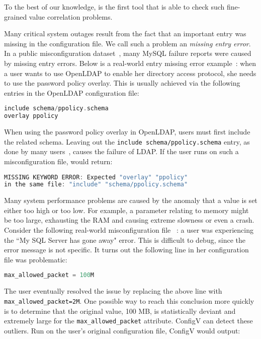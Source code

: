 To the best of our knowledge, \app is the first tool that
is able to check such fine-grained value correlation problems.


Many critical system outages result from the fact that an important
entry was missing in the configuration file. 
We call such a problem an {\em missing entry error}.
In a public misconfiguration dataset~\cite{configdataset},
many MySQL failure reports were caused by
missing entry errors.
Below is a real-world entry missing error example~\cite{yin11anempirical}:
when a user wants to use OpenLDAP to enable her directory access
protocol, she needs to use the password policy overlay. This is usually
achieved via the following entries in the OpenLDAP configuration file:

\begin{lstlisting}[language=C, xleftmargin=.01\textwidth]
include schema/ppolicy.schema
overlay ppolicy
\end{lstlisting} 

When using the password policy overlay in OpenLDAP, 
users must first include the related schema.
Leaving out the {\tt include schema/ppolicy.schema} entry, 
as done by many users~\cite{yin11anempirical}, 
causes the failure of LDAP. 
If the user runs \app on such a misconfiguration file,
\app would return:

\begin{lstlisting}[language=C, xleftmargin=.01\textwidth]
MISSING KEYWORD ERROR: Expected "overlay" "ppolicy"
in the same file: "include" "schema/ppolicy.schema"
\end{lstlisting} 

Many system performance problems are caused by the
anomaly that a value is set either too high or too low.
For example, a parameter relating to memory might be too large,
exhausting the RAM and causing extreme slowness or even a crash. 
Consider the following real-world misconfiguration file%
~\cite{singleValue}: a user was experiencing the ``My SQL Server 
has gone away" error.  
This is difficult to debug, since the error message is not specific.
It turns out the following line in her configuration file was problematic:

\begin{lstlisting}[language=C, xleftmargin=.01\textwidth]
max_allowed_packet = 100M
\end{lstlisting} 

The user eventually resolved the issue by replacing the above line with {\tt max\_allowed\_packet=2M}.
One possible way to reach this conclusion more quickly is to determine that the original value, 100 MB, 
is statistically deviant and extremely large for the {\tt max\_allowed\_packet} attribute. 
ConfigV can detect these
outliers. Run on the user's original configuration file, ConfigV would output:

